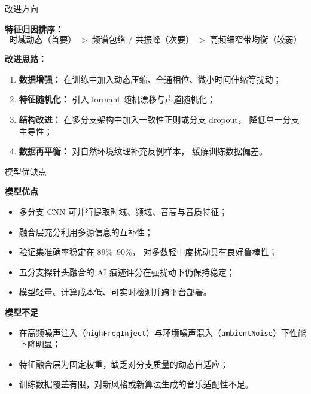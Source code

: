 \documentclass[aspectratio=169]{beamer}
\providecommand{\paragraph}[1]{\smallskip\textbf{#1}\par}
\begin{document}
\begin{frame}{改进方向}

\textbf{特征归因排序：}
\[
\text{时域动态（首要）} \; > \;
\text{频谱包络 / 共振峰（次要）} \; > \;
\text{高频细窄带均衡（较弱）}
\]

\vspace{0.6em}
\textbf{改进思路：}
\begin{enumerate}
  \item \textbf{数据增强：}  
        在训练中加入动态压缩、全通相位、微小时间伸缩等扰动；
  \item \textbf{特征随机化：}  
        引入 formant 随机漂移与声道随机化；
  \item \textbf{结构改进：}  
        在多分支架构中加入一致性正则或分支 dropout，
        降低单一分支主导性；
  \item \textbf{数据再平衡：}  
        对自然环境纹理补充反例样本，
        缓解训练数据偏差。
\end{enumerate}

\end{frame}

\begin{frame}{模型优缺点}

\small
\paragraph{模型优点}
\begin{itemize}
  \item 多分支 CNN 可并行提取时域、频域、音高与音质特征；
  \item 融合层充分利用多源信息的互补性；
  \item 验证集准确率稳定在 89\%--90\%，
        对多数轻中度扰动具有良好鲁棒性；
  \item 五分支探针头融合的 AI 痕迹评分在强扰动下仍保持稳定；
  \item 模型轻量、计算成本低、可实时检测并跨平台部署。
\end{itemize}

\vspace{0.6em}
\paragraph{模型不足}
\begin{itemize}
  \item 在高频噪声注入（\texttt{highFreqInject}）与环境噪声混入（\texttt{ambientNoise}）下性能下降明显；
  \item 特征融合层为固定权重，缺乏对分支质量的动态自适应；
  \item 训练数据覆盖有限，对新风格或新算法生成的音乐适配性不足。
\end{itemize}

\end{frame}
\end{document}
